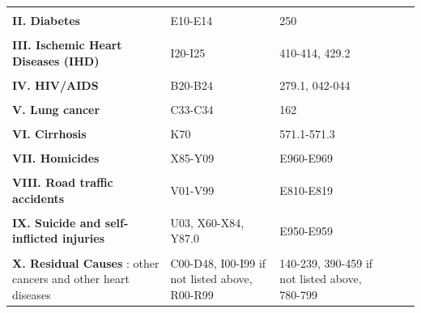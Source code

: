 \documentclass{article}
\begin{document}
{\begin{longtable}{p{8cm}p{4cm}p{4cm}ccc}
 & \\          
 {\bf II. Diabetes}  & E10-E14 & 250 \\      
 & \\
 {\bf III. Ischemic Heart Diseases (IHD)}   & I20-I25 & 410-414, 429.2\\
 & \\           
 {\bf IV. HIV/AIDS} & B20-B24 & 279.1, 042-044\\ 
  & \\                
{\bf V. Lung cancer}  & C33-C34 & 162\\
  & \\          
{\bf VI. Cirrhosis}&  K70 & 571.1-571.3\\
 & \\          
{\bf VII. Homicides}  & X85-Y09 & E960-E969\\     
 & \\           
 {\bf VIII. Road traffic accidents}  & V01-V99 & E810-E819 \\     
 & \\           
{\bf IX. Suicide and self-inflicted injuries}  & U03, X60-X84, Y87.0 & E950-E959\\ 
 & \\          
{\bf X. Residual Causes }:  other cancers and other heart diseases & C00-D48, I00-I99 if not listed above, R00-R99 & 140-239, 390-459 if not listed above, 780-799
\label{ME_Mex}
\end{longtable}
}
\end{document}
